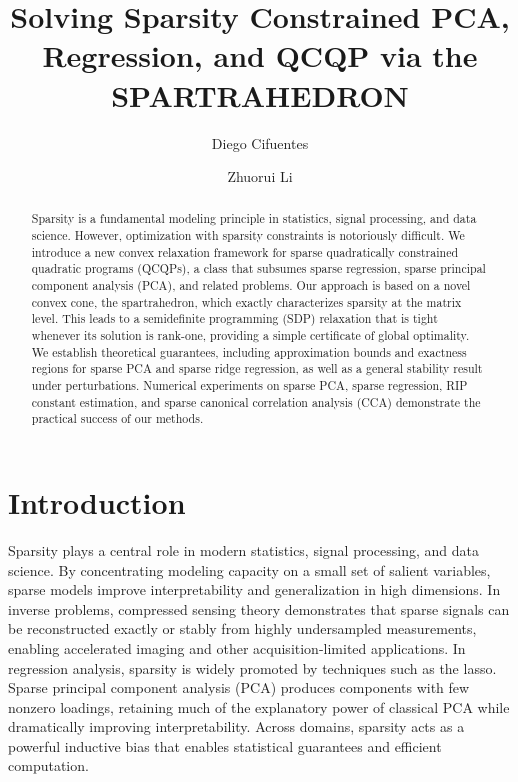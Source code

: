 \documentclass[11pt]{amsart}
\newcommand{\ourset}{spartrahedron\xspace}
\theoremstyle{plain}
\theoremstyle{definition}
\theoremstyle{remark}
\begin{document}
	
	\title[Sparse PCA, Regression, and QCQP via the \MakeUppercase{\ourset}]
	{Solving Sparsity Constrained PCA, Regression, and QCQP via the \MakeUppercase{\ourset}}
	\author{Diego Cifuentes}
	\address{}
	
	\author{Zhuorui Li}
	\address{Georgia Institute of Technology \ Atlanta, GA, USA}
	
	\begin{abstract}
		Sparsity is a fundamental modeling principle in statistics, signal processing, and data science. 
		However, optimization with sparsity constraints is notoriously difficult. 
		We introduce a new convex relaxation framework for {sparse quadratically constrained quadratic programs} (QCQPs), a class that subsumes sparse regression, sparse principal component analysis (PCA), and related problems. 
		Our approach is based on a novel convex cone, the {\ourset}, which exactly characterizes sparsity at the matrix level. 
		This leads to a semidefinite programming (SDP) relaxation that is tight whenever its solution is rank-one, providing a simple certificate of global optimality. 
		We establish theoretical guarantees, including approximation bounds and exactness regions for sparse PCA and sparse ridge regression, as well as a general stability result under perturbations. 
		Numerical experiments on sparse PCA, sparse regression, RIP constant estimation, and sparse canonical correlation analysis (CCA) demonstrate the practical success of our methods. 
	\end{abstract}
	
	\maketitle
	
	\section{Introduction}
	
	Sparsity plays a central role in modern statistics, signal processing, and data science.
	By concentrating modeling capacity on a small set of salient variables, sparse models improve interpretability and generalization in high dimensions.
	In inverse problems, compressed sensing theory demonstrates that sparse signals can be reconstructed exactly or stably from highly undersampled measurements, enabling accelerated imaging and other acquisition-limited applications.
	In regression analysis, sparsity is widely promoted by techniques such as the lasso.
	Sparse principal component analysis (PCA) produces components with few nonzero loadings, retaining much of the explanatory power of classical PCA while dramatically improving interpretability.
	Across domains, sparsity acts as a powerful inductive bias that enables statistical guarantees and efficient computation.
	
\end{document}
